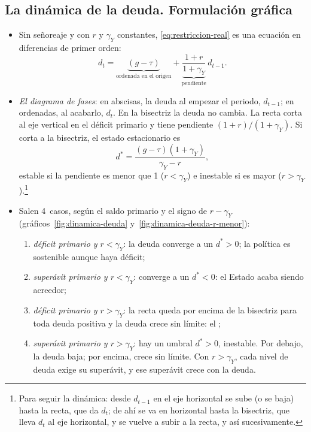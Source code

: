 \documentclass[11pt]{article}
\begin{document}
\subsection{La dinámica de la deuda. Formulación gráfica}\label{sec:formulacion-grafica}

\begin{itemize}
\item Sin señoreaje y con $r$ y $\gamma_Y$ constantes, \eqref{eq:restriccion-real} es una ecuación en diferencias de primer orden:
  \begin{equation}\label{eq:dinamica-fases}
  d_t=\underbrace{(g-\tau)}_{\text{ordenada en el origen}}+\underbrace{\frac{1+r}{1+\gamma_Y}}_{\text{pendiente}}\,d_{t-1} .
  \end{equation}
\item \emph{El diagrama de fases}: en abscisas, la deuda al empezar el periodo, $d_{t-1}$; en ordenadas, al acabarlo, $d_t$. En la bisectriz la deuda no cambia. La recta corta al eje vertical en el déficit primario y tiene pendiente $(1+r)/(1+\gamma_Y)$. Si corta a la bisectriz, el estado estacionario es
  \begin{equation*}
  d^*=\frac{(g-\tau)(1+\gamma_Y)}{\gamma_Y-r},
  \end{equation*}
  estable si la pendiente es menor que 1 ($r<\gamma_Y$) e inestable si es mayor ($r>\gamma_Y$).\footnote{Para seguir la dinámica: desde $d_{t-1}$ en el eje horizontal se sube (o se baja) hasta la recta, que da $d_t$; de ahí se va en horizontal hasta la bisectriz, que lleva $d_t$ al eje horizontal, y se vuelve a subir a la recta, y así sucesivamente.}
\item Salen 4~casos, según el saldo primario y el signo de $r-\gamma_Y$ (gráficos~\ref{fig:dinamica-deuda} y~\ref{fig:dinamica-deuda-r-menor}):
  \begin{enumerate}
  \item \emph{déficit primario y $r<\gamma_Y$}: la deuda converge a un $d^*>0$; la política es sostenible aunque haya déficit;
  \item \emph{superávit primario y $r<\gamma_Y$}: converge a un $d^*<0$: el Estado acaba siendo acreedor;
  \item \emph{déficit primario y $r>\gamma_Y$}: la recta queda por encima de la bisectriz para toda deuda positiva y la deuda crece sin límite: el ;
  \item \emph{superávit primario y $r>\gamma_Y$}: hay un umbral $d^*>0$, inestable. Por debajo, la deuda baja; por encima, crece sin límite. Con $r>\gamma_Y$, cada nivel de deuda exige su superávit, y ese superávit crece con la deuda.

\end{enumerate}
\end{itemize}
\end{document}
